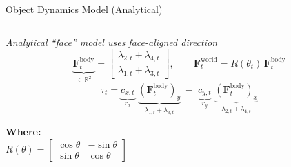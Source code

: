 \documentclass[10pt, aspectratio=169]{beamer}
\begin{document}
\begin{frame}{Object Dynamics Model (Analytical)}
  \begin{columns}[T,onlytextwidth]
    \begin{column}{0.72\textwidth}
      \emph{Analytical “face” model uses face-aligned direction}
      \[
        \underbrace{\mathbf{F}^{\text{body}}_t}_{\in\mathbb{R}^2}
        =
        \begin{bmatrix}
          \lambda_{2,t}+\lambda_{4,t}\\[0.2em]
          \lambda_{1,t}+\lambda_{3,t}
        \end{bmatrix},
        \qquad
        \mathbf{F}^{\text{world}}_t = R(\theta_t)\,\mathbf{F}^{\text{body}}_t
      \]
      \[
        \tau_t
        = \underbrace{c_{x,t}}_{r_x}\,\,\underbrace{(\mathbf{F}^{\text{body}}_t)_y}_{\lambda_{1,t}+\lambda_{3,t}}
          \;-\;
          \underbrace{c_{y,t}}_{r_y}\,\,\underbrace{(\mathbf{F}^{\text{body}}_t)_x}_{\lambda_{2,t}+\lambda_{4,t}}
      \]

      \textbf{Where:}  \\
      $R(\theta)=\begin{bmatrix}\cos\theta & -\sin\theta\\ \sin\theta & \cos\theta\end{bmatrix}$  \\
      
    \end{column}


\end{columns}
\end{frame}
\end{document}
